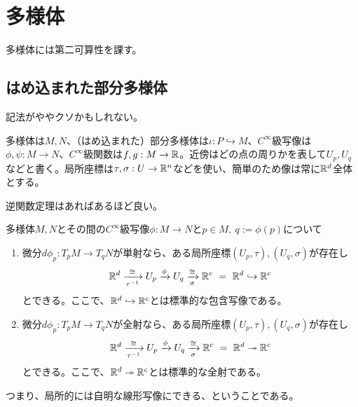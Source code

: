 \section{多様体}
多様体には第二可算性を課す。

\subsection{はめ込まれた部分多様体}
記法がややクソかもしれない。
\begin{rem}[記法]
    多様体は$M,N$、（はめ込まれた）部分多様体は$\iota:P\hookrightarrow M$、$C^\infty$級写像は$\phi,\psi:M\to N$、$C^\infty$級関数は$f,g:M\to\mathbb{R}$。近傍はどの点の周りかを表して$U_p,U_q$などと書く。局所座標は$\tau,\sigma:U\to\mathbb{R}^n$などを使い、簡単のため像は常に$\mathbb{R}^d$全体とする。
\end{rem}
逆関数定理はあればあるほど良い。
\begin{rem}[逆関数定理]
    多様体$M,N$とその間の$C^\infty$級写像$\phi:M\to N$と$p\in M,\ q:=\phi(p)$について
    \begin{enumerate}[(1)]
        \item 微分$d\phi_p:T_pM\to T_qN$が単射なら、ある局所座標$(U_p,\tau),(U_q,\sigma)$が存在し
        \[\R^d\xrightarrow[\tau^{-1}]{\cong} U_p\xrightarrow{\phi}U_q\xrightarrow[\sigma]{\cong}\R^c\ =\ \R^d\hookrightarrow\R^c\]
        とできる。ここで、$\mathbb{R}^d\hookrightarrow\mathbb{R}^c$とは標準的な包含写像である。
        \item 微分$d\phi_p:T_pM\to T_qN$が全射なら、ある局所座標$(U_p,\tau),(U_q,\sigma)$が存在し
        \[\R^d\xrightarrow[\tau^{-1}]{\cong} U_p\xrightarrow{\phi}U_q\xrightarrow[\sigma]{\cong}\R^c\ =\ \R^d\twoheadrightarrow\R^c\]
        とできる。ここで、$\mathbb{R}^d\twoheadrightarrow\mathbb{R}^c$とは標準的な全射である。
    \end{enumerate}
    つまり、局所的には自明な線形写像にできる、ということである。
\end{rem}


